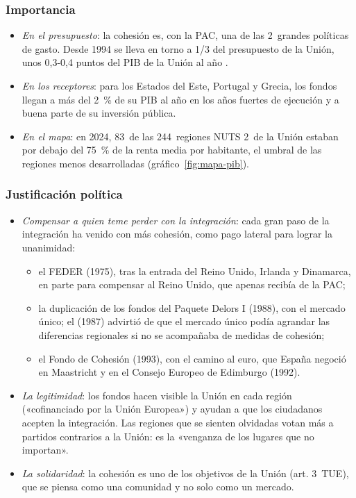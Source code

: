 \documentclass[11pt]{article}
\begin{document}
\subsubsection{Importancia}

\begin{itemize}
\item \emph{En el presupuesto}: la cohesión es, con la PAC, una de las 2~grandes políticas de gasto. Desde 1994 se lleva en torno a 1/3 del presupuesto de la Unión, unos 0,3-0,4 puntos del PIB de la Unión al año .
\item \emph{En los receptores}: para los Estados del Este, Portugal y Grecia, los fondos llegan a más del 2~\% de su PIB al año en los años fuertes de ejecución y a buena parte de su inversión pública\nocite{CE2024Informe9}.
\item \emph{En el mapa}: en 2024, 83~de las 244~regiones NUTS 2~de la Unión estaban por debajo del 75~\% de la renta media por habitante, el umbral de las regiones menos desarrolladas (gráfico~\ref{fig:mapa-pib})\nocite{Eurostat2026Regional}.
\end{itemize}

\subsubsection{Justificación política}

\begin{itemize}
\item \emph{Compensar a quien teme perder con la integración}: cada gran paso de la integración ha venido con más cohesión, como pago lateral para lograr la unanimidad:
  \begin{itemize}
  \item el FEDER (1975), tras la entrada del Reino Unido, Irlanda y Dinamarca, en parte para compensar al Reino Unido, que apenas recibía de la PAC;
  \item la duplicación de los fondos del Paquete Delors I (1988), con el mercado único; el  (1987) advirtió de que el mercado único podía agrandar las diferencias regionales si no se acompañaba de medidas de cohesión\nocite{PadoaSchioppa1987};
  \item el Fondo de Cohesión (1993), con el camino al euro, que España negoció en Maastricht y en el Consejo Europeo de Edimburgo (1992).
  \end{itemize}
\item \emph{La legitimidad}: los fondos hacen visible la Unión en cada región («cofinanciado por la Unión Europea») y ayudan a que los ciudadanos acepten la integración. Las regiones que se sienten olvidadas votan más a partidos contrarios a la Unión: es la «venganza de los lugares que no importan»\nocite{RodriguezPose2018}.
\item \emph{La solidaridad}: la cohesión es uno de los objetivos de la Unión (art. 3~TUE), que se piensa como una comunidad y no solo como un mercado.
\end{itemize}
\end{document}
